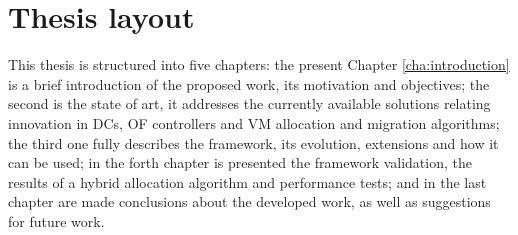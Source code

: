 \documentclass[12pt,english,oneside]{book}
\begin{document}



\section{Thesis layout}
\hspace{0.6cm}

This thesis is structured into five chapters: the present Chapter \ref{cha:introduction} is a brief introduction of the proposed work, its motivation and objectives; the second is the state of art, it addresses the currently available solutions relating innovation in DCs, OF controllers and VM allocation and migration algorithms; the third one fully describes the framework, its evolution, extensions and how it can be used; in the forth chapter is presented the framework validation, the results of a hybrid allocation algorithm and performance tests; and in the last chapter are made conclusions about the developed work, as well as suggestions for future work.
\end{document}
